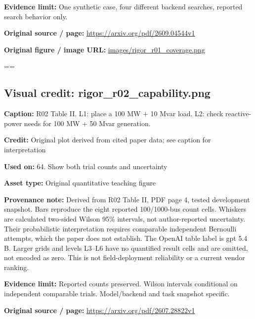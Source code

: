 \documentclass[10pt,letterpaper]{article}
\begin{document}
\textbf{Evidence limit:} One synthetic case, four different backend searches, reported search behavior only.\par
\textbf{Original source / page:} \href{https://arxiv.org/pdf/2609.04544v1}{\small\ttfamily https:/\allowbreak{}/\allowbreak{}arxiv.\allowbreak{}org/\allowbreak{}pdf/\allowbreak{}2609.\allowbreak{}04544v1}\par
\textbf{Original figure / image URL:} \href{images/rigor_r01_coverage.png}{\small\ttfamily images/\allowbreak{}rigor\_\allowbreak{}r01\_\allowbreak{}coverage.\allowbreak{}png}\par
\egroup\par\noindent\box\readingEntry\par\medskip
\setbox\readingEntry=\vbox\bgroup\hsize=\linewidth\subsection*{Visual credit: rigor\_r02\_capability.png}
\textbf{Caption:} R02 Table II. L1: place a 100 MW + 10 Mvar load. L2: check reactive-power needs for 100 MW + 50 Mvar generation.\par
\textbf{Credit:} Original plot derived from cited paper data; see caption for interpretation\par
\textbf{Used on:} 64. Show both trial counts and uncertainty\par
\textbf{Asset type:} Original quantitative teaching figure\par
\textbf{Provenance note:} Derived from R02 Table II, PDF page 4, tested development snapshot. Bars reproduce the eight reported 100/1000-bus count cells. Whiskers are calculated two-sided Wilson 95\% intervals, not author-reported uncertainty. Their probabilistic interpretation requires comparable independent Bernoulli attempts, which the paper does not establish. The OpenAI table label is gpt 5.4 B. Larger grids and levels L3--L6 have no quantified result cells and are omitted, not encoded as zero. This is not field-deployment reliability or a current vendor ranking.\par
\textbf{Evidence limit:} Reported counts preserved. Wilson intervals conditional on independent comparable trials. Model/backend and task snapshot specific.\par
\textbf{Original source / page:} \href{https://arxiv.org/pdf/2607.28822v1}{\small\ttfamily https:/\allowbreak{}/\allowbreak{}arxiv.\allowbreak{}org/\allowbreak{}pdf/\allowbreak{}2607.\allowbreak{}28822v1}\par
\end{document}
